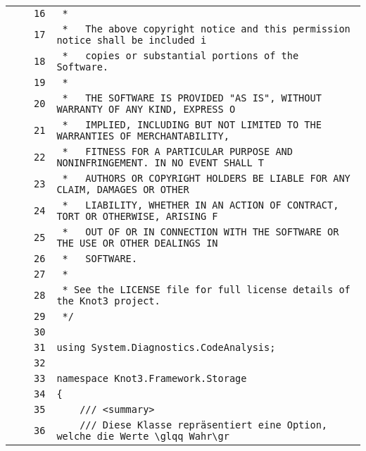 \documentclass[a4paper,10pt]{article}
\begin{document}
\begin{longtable}[l]{lrrl}
\cellcolor{gray} &  & \verb~16~ & \verb~ *~\\
\cellcolor{gray} &  & \verb~17~ & \verb~ *   The above copyright notice and this permission notice shall be included i~\\
\cellcolor{gray} &  & \verb~18~ & \verb~ *   copies or substantial portions of the Software.~\\
\cellcolor{gray} &  & \verb~19~ & \verb~ *~\\
\cellcolor{gray} &  & \verb~20~ & \verb~ *   THE SOFTWARE IS PROVIDED "AS IS", WITHOUT WARRANTY OF ANY KIND, EXPRESS O~\\
\cellcolor{gray} &  & \verb~21~ & \verb~ *   IMPLIED, INCLUDING BUT NOT LIMITED TO THE WARRANTIES OF MERCHANTABILITY,~\\
\cellcolor{gray} &  & \verb~22~ & \verb~ *   FITNESS FOR A PARTICULAR PURPOSE AND NONINFRINGEMENT. IN NO EVENT SHALL T~\\
\cellcolor{gray} &  & \verb~23~ & \verb~ *   AUTHORS OR COPYRIGHT HOLDERS BE LIABLE FOR ANY CLAIM, DAMAGES OR OTHER~\\
\cellcolor{gray} &  & \verb~24~ & \verb~ *   LIABILITY, WHETHER IN AN ACTION OF CONTRACT, TORT OR OTHERWISE, ARISING F~\\
\cellcolor{gray} &  & \verb~25~ & \verb~ *   OUT OF OR IN CONNECTION WITH THE SOFTWARE OR THE USE OR OTHER DEALINGS IN~\\
\cellcolor{gray} &  & \verb~26~ & \verb~ *   SOFTWARE.~\\
\cellcolor{gray} &  & \verb~27~ & \verb~ *~\\
\cellcolor{gray} &  & \verb~28~ & \verb~ * See the LICENSE file for full license details of the Knot3 project.~\\
\cellcolor{gray} &  & \verb~29~ & \verb~ */~\\
\cellcolor{gray} &  & \verb~30~ & \verb~~\\
\cellcolor{gray} &  & \verb~31~ & \verb~using System.Diagnostics.CodeAnalysis;~\\
\cellcolor{gray} &  & \verb~32~ & \verb~~\\
\cellcolor{gray} &  & \verb~33~ & \verb~namespace Knot3.Framework.Storage~\\
\cellcolor{gray} &  & \verb~34~ & \verb~{~\\
\cellcolor{gray} &  & \verb~35~ & \verb~    /// <summary>~\\
\cellcolor{gray} &  & \verb~36~ & \verb~    /// Diese Klasse repräsentiert eine Option, welche die Werte \glqq Wahr\gr~\\

\end{longtable}
\end{document}
